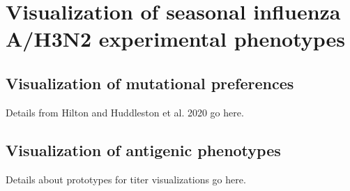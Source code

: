 \chapter{Visualization of seasonal influenza A/H3N2 experimental phenotypes}

\section{Visualization of mutational preferences}

Details from Hilton and Huddleston et al. 2020 go here.

\section{Visualization of antigenic phenotypes}

Details about prototypes for titer visualizations go here.
